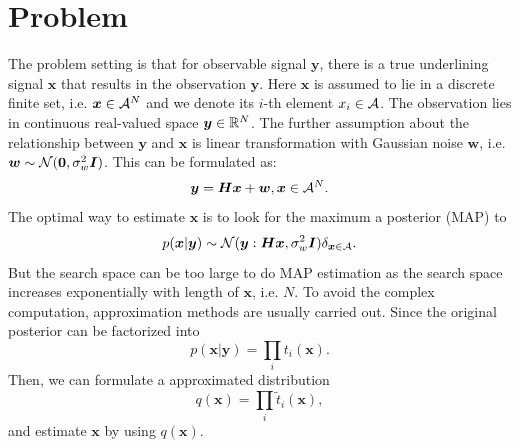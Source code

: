 \documentclass{article}
\begin{document}
    

\section{Problem}\label{sec:problem}
The problem setting is that for observable signal $\bm{y}$, there is a true underlining signal $\bm{x}$ that results in the observation $\bm{y}$. Here $\bm{x}$ is assumed to lie in a discrete finite set, i.e. $\bm{x} \in {\mathcal{A}}^{N}$ and we denote its $i$-th element $x_i \in \mathcal{A}$. The observation lies in continuous real-valued space $\bm{y}\in \mathbb{R}^N$. The further assumption about the relationship between $\bm{y}$ and $\bm{x}$ is linear transformation with Gaussian noise $\bm{w}$, i.e. $\bm{w}\sim \mathcal{N}(\bm{0}, \sigma_{w}^2 \bm{I})$. This can be formulated as:
\begin{equation}\label{eq:linear-model}
  \bm{y} = \bm{H} \bm{x} + \bm{w}, \bm{x} \in {\mathcal{A}}^{N}.
\end{equation}
The optimal way to estimate $\bm{x}$ is to look for the maximum a posterior (MAP) to
\begin{equation}
  p(\bm{x}|\bm{y}) \sim \mathcal{N}(\bm{y}: \bm{H}\bm{x}, \sigma_{w}^2\bm{I})\delta_{\bm{x}\in \mathcal{A}}.
\end{equation}
But the search space can be too large to do MAP estimation as the search space increases exponentially with length of $\bm{x}$, i.e. $N$.
To avoid the complex computation, approximation methods are usually carried out. Since the original posterior can be factorized into
\begin{equation}
  p(\bm{x}|\bm{y}) = \prod_i t_i(\bm{x}).
\end{equation}
Then, we can formulate a approximated distribution 
\begin{equation}\label{eq:apx-dist-q}
  q(\bm{x}) = \prod_i \tilde{t}_i(\bm{x}),
\end{equation}
and estimate $\bm{x}$ by using $q(\bm{x})$.
\end{document}
